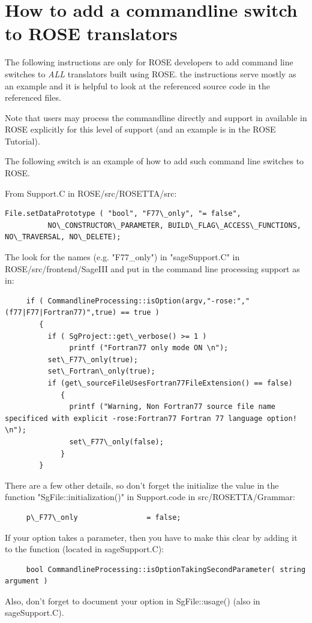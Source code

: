 \newpage

\section{How to add a commandline switch to ROSE translators}
   The following instructions are only for ROSE developers to add 
command line switches to {\em ALL} translators built using ROSE.
the instructions serve mostly as an example and it is helpful to look
at the referenced source code in the referenced files.

Note that users may process the commandline directly and support in
available in ROSE explicitly for this level of support (and an example is
in the ROSE Tutorial).

The following switch is an example of how to add such command line switches to ROSE.

From Support.C in ROSE/src/ROSETTA/src:
{
\indent
\begin{verbatim}
File.setDataPrototype ( "bool", "F77\_only", "= false",
          NO\_CONSTRUCTOR\_PARAMETER, BUILD\_FLAG\_ACCESS\_FUNCTIONS, NO\_TRAVERSAL, NO\_DELETE);
\end{verbatim} 
}

The look for the names (e.g. "F77\_only") in "sageSupport.C" in ROSE/src/frontend/SageIII
and put in the command line processing support as in:
{
\indent
\begin{verbatim}
     if ( CommandlineProcessing::isOption(argv,"-rose:","(f77|F77|Fortran77)",true) == true )
        {
          if ( SgProject::get\_verbose() >= 1 )
               printf ("Fortran77 only mode ON \n");
          set\_F77\_only(true);
          set\_Fortran\_only(true);
          if (get\_sourceFileUsesFortran77FileExtension() == false)
             {
               printf ("Warning, Non Fortran77 source file name specificed with explicit -rose:Fortran77 Fortran 77 language option! \n");
               set\_F77\_only(false);
             }
        }
\end{verbatim} 
}

There are a few other details, so don't forget the initialize
the value in the function "SgFile::initialization()" in Support.code
in src/ROSETTA/Grammar:
{
\indent
\begin{verbatim}
     p\_F77\_only                = false;
\end{verbatim} 
}

If your option takes a parameter, then you have to make this clear by adding it to the
function (located in sageSupport.C):
{
\indent
\begin{verbatim}
     bool CommandlineProcessing::isOptionTakingSecondParameter( string argument )
\end{verbatim} 
}

Also, don't forget to document your option in SgFile::usage() (also in sageSupport.C).


